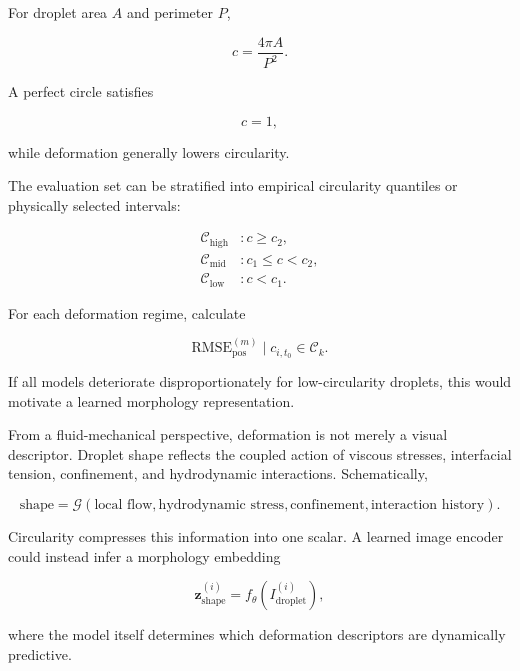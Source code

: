 \documentclass[11pt]{article}
\begin{document}
For droplet area \(A\) and perimeter \(P\),

\begin{equation}
c
=
\frac{4\pi A}{P^2}.
\end{equation}

A perfect circle satisfies

\begin{equation}
c=1,
\end{equation}

while deformation generally lowers circularity.

The evaluation set can be stratified into empirical circularity quantiles or physically selected intervals:

\begin{align}
\mathcal{C}_{\mathrm{high}} &: c\ge c_2,\\
\mathcal{C}_{\mathrm{mid}} &: c_1\le c<c_2,\\
\mathcal{C}_{\mathrm{low}} &: c<c_1.
\end{align}

For each deformation regime, calculate

\begin{equation}
\mathrm{RMSE}_{\mathrm{pos}}^{(m)}
\mid
c_{i,t_0}\in\mathcal{C}_k.
\end{equation}

If all models deteriorate disproportionately for low-circularity droplets, this would motivate a learned morphology representation.

From a fluid-mechanical perspective, deformation is not merely a visual descriptor. Droplet shape reflects the coupled action of viscous stresses, interfacial tension, confinement, and hydrodynamic interactions. Schematically,

\begin{equation}
\text{shape}
=
\mathcal{G}
\left(
\text{local flow},
\text{hydrodynamic stress},
\text{confinement},
\text{interaction history}
\right).
\end{equation}

Circularity compresses this information into one scalar. A learned image encoder could instead infer a morphology embedding

\begin{equation}
\mathbf{z}_{\mathrm{shape}}^{(i)}
=
f_{\theta}
\left(
I_{\mathrm{droplet}}^{(i)}
\right),
\end{equation}

where the model itself determines which deformation descriptors are dynamically predictive.
\end{document}
